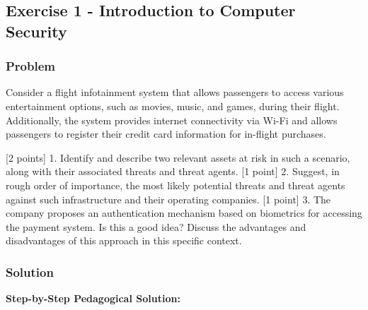 \documentclass{article}
\begin{document}
\subsection{Exercise 1 - Introduction to Computer Security}
\subsubsection*{Problem}
Consider a flight infotainment system that allows passengers to access various entertainment options, such as movies, music, and games, during their flight. Additionally, the system provides internet connectivity via Wi-Fi and allows passengers to register their credit card information for in-flight purchases.

[2 points] 1. Identify and describe two relevant assets at risk in such a scenario, along with their associated threats and threat agents.
[1 point] 2. Suggest, in rough order of importance, the most likely potential threats and threat agents against such infrastructure and their operating companies.
[1 point] 3. The company proposes an authentication mechanism based on biometrics for accessing the payment system. Is this a good idea? Discuss the advantages and disadvantages of this approach in this specific context.

\subsubsection*{Solution}
\textbf{Step-by-Step Pedagogical Solution:}
\end{document}

